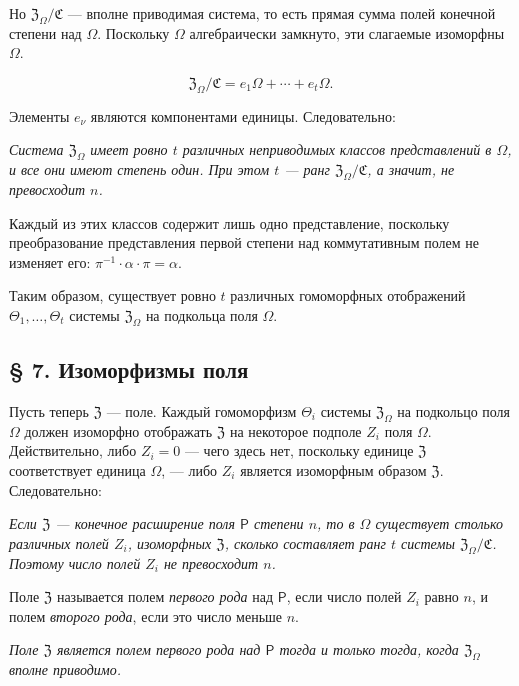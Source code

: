 \documentclass[11pt]{article}
\begin{document}
Но \(\mathfrak Z_\Omega/\mathfrak C\) --- вполне приводимая система, то есть прямая сумма полей конечной степени над \(\Omega\). Поскольку \(\Omega\) алгебраически замкнуто, эти слагаемые изоморфны \(\Omega\).

\[
\mathfrak Z_\Omega/\mathfrak C=e_1\Omega+\cdots+e_t\Omega.
\]

Элементы \(e_\nu\) являются компонентами единицы. Следовательно:

\emph{Система \(\mathfrak Z_\Omega\) имеет ровно \(t\) различных неприводимых классов представлений в \(\Omega\), и все они имеют степень один. При этом \(t\) --- ранг \(\mathfrak Z_\Omega/\mathfrak C\), а значит, не превосходит \(n\).}

Каждый из этих классов содержит лишь одно представление, поскольку преобразование представления первой степени над коммутативным полем не изменяет его: \(\pi^{-1}\cdot\alpha\cdot\pi=\alpha\).

Таким образом, существует ровно \(t\) различных гомоморфных отображений \(\Theta_1,\ldots,\Theta_t\) системы \(\mathfrak Z_\Omega\) на подкольца поля \(\Omega\).

\subsection*{§ 7. Изоморфизмы поля}\label{die-isomorphismen-eines-koerpers}

Пусть теперь \(\mathfrak Z\) --- поле. Каждый гомоморфизм \(\Theta_i\) системы \(\mathfrak Z_\Omega\) на подкольцо поля \(\Omega\) должен изоморфно отображать \(\mathfrak Z\) на некоторое подполе \(Z_i\) поля \(\Omega\). Действительно, либо \(Z_i=0\) --- чего здесь нет, поскольку единице \(\mathfrak Z\) соответствует единица \(\Omega\), --- либо \(Z_i\) является изоморфным образом \(\mathfrak Z\). Следовательно:

\emph{Если \(\mathfrak Z\) --- конечное расширение поля \(\mathsf P\) степени \(n\), то в \(\Omega\) существует столько различных полей \(Z_i\), изоморфных \(\mathfrak Z\), сколько составляет ранг \(t\) системы \(\mathfrak Z_\Omega/\mathfrak C\). Поэтому число полей \(Z_i\) не превосходит \(n\).}

Поле \(\mathfrak Z\) называется полем \emph{первого рода} над \(\mathsf P\), если число полей \(Z_i\) равно \(n\), и полем \emph{второго рода}, если это число меньше \(n\).

\emph{Поле \(\mathfrak Z\) является полем первого рода над \(\mathsf P\) тогда и только тогда, когда \(\mathfrak Z_\Omega\) вполне приводимо.}
\end{document}
